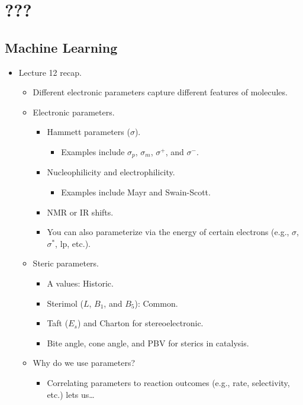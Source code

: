 \documentclass[../notes.tex]{subfiles}
\begin{document}
\chapter{???}
\section{Machine Learning}
\begin{itemize}
    \item {}Lecture 12 recap.
    \begin{itemize}
        \item Different electronic parameters capture different features of molecules.
        \item Electronic parameters.
        \begin{itemize}
            \item Hammett parameters ($\sigma$).
            \begin{itemize}
                \item Examples include $\sigma_p$, $\sigma_m$, $\sigma^+$, and $\sigma^-$.
            \end{itemize}
            \item Nucleophilicity and electrophilicity.
            \begin{itemize}
                \item Examples include Mayr and Swain-Scott.
            \end{itemize}
            \item NMR or IR shifts.
            \item You can also parameterize via the energy of certain electrons (e.g., $\sigma$, $\sigma^*$, lp, etc.).
        \end{itemize}
        \item Steric parameters.
        \begin{itemize}
            \item A values: Historic.
            \item Sterimol ($L$, $B_1$, and $B_5$): Common.
            \item Taft ($E_s$) and Charton for stereoelectronic.
            \item Bite angle, cone angle, and PBV for sterics in catalysis.
        \end{itemize}
        \item Why do we use parameters?
        \begin{itemize}
            \item Correlating parameters to reaction outcomes (e.g., rate, selectivity, etc.) lets us\dots

\end{itemize}
\end{itemize}
\end{itemize}
\end{document}
